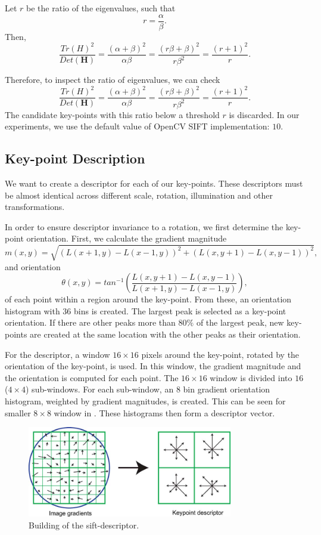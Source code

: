 Let $r$ be the ratio of the eigenvalues, such that
\begin{equation}
    r=\frac{\alpha}{\beta}.
\end{equation}
Then,
\begin{equation}
    \frac{Tr(H)^2}{Det(\boldsymbol{H})} = \frac{(\alpha+\beta)^2}{\alpha\beta}=\frac{(r\beta+\beta)^2}{r\beta^2} = \frac{(r+1)^2}{r}.
\end{equation}

Therefore, to inspect the ratio of eigenvalues, we can check
\begin{equation}
    \frac{Tr(H)^2}{Det(\boldsymbol{H})} = \frac{(\alpha+\beta)^2}{\alpha\beta}=\frac{(r\beta+\beta)^2}{r\beta^2} = \frac{(r+1)^2}{r}.
\end{equation}
The candidate key-points with this ratio below a threshold $r$ is discarded. In our experiments, we use the default value of OpenCV SIFT implementation: $10$.

\subsection{Key-point Description}
We want to create a descriptor for each of our key-points. These descriptors must be almost identical across different scale, rotation, illumination and other transformations.

In order to ensure descriptor invariance to a rotation, we first determine the key-point orientation. First, we calculate the gradient magnitude
\begin{equation}
    m(x,y) = \sqrt{(L(x+1,y)-L(x-1,y))^2+(L(x,y+1)-L(x,y-1))^2},
\end{equation}
and orientation
\begin{equation}
    \theta(x,y) = tan^{-1}\left(\frac{L(x,y+1)-L(x,y-1)}{L(x+1,y)-L(x-1,y)}\right),
\end{equation}
of each point within a region around the key-point. From these, an orientation histogram with $36$ bins is created. The largest peak is selected as a key-point orientation. If there are other peaks more than $80\%$ of the largest peak, new key-points are created at the same location with the other peaks as their orientation.

For the descriptor, a window $16\times16$ pixels around the key-point, rotated by the orientation of the key-point, is used. In this window, the gradient magnitude and the orientation is computed for each point. The $16\times16$ window is divided into $16$ ($4\times4$) sub-windows. For each sub-window, an $8$ bin gradient orientation histogram, weighted by gradient magnitudes, is created. This can be seen for smaller $8\times8$ window in . These histograms then form a descriptor vector.

\begin{figure}
    \centering
    \includegraphics[width=0.8\textwidth]{Figures/sift/descriptor.jpg}
    \caption[Extracting the sift-descriptor.]{Building of the sift-descriptor. \cite{Lowe2004}}
    \label{fig:sift_descriptor}
\end{figure}
